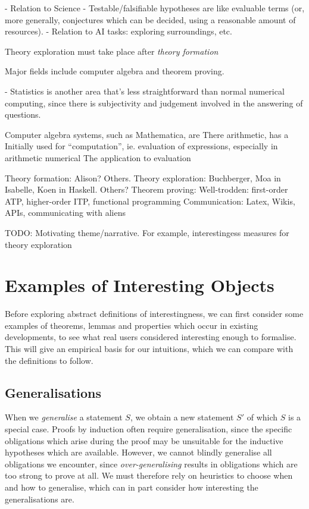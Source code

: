 \documentclass[]{article}
\begin{document}
 - Relation to Science
  - Testable/falsifiable hypotheses are like evaluable terms (or, more generally, conjectures which can be decided, using a reasonable amount of resources).
 - Relation to AI tasks: exploring surroundings, etc.

Theory exploration must take place after \emph{theory formation}

Major fields include computer algebra and theorem proving.

- Statistics is another area that's less straightforward than normal numerical computing, since there is subjectivity and judgement involved in the answering of questions.

Computer algebra systems, such as Mathematica, are
There arithmetic, has a Initially used for ``computation'', ie. evaluation of expressions,
especially in arithmetic numerical The application to evaluation

Theory formation: Alison? Others.
Theory exploration: Buchberger, Moa in Isabelle, Koen in Haskell. Others?
Theorem proving: Well-trodden: first-order ATP, higher-order ITP, functional programming
Communication: Latex, Wikis, APIs, communicating with aliens

TODO: Motivating theme/narrative. For example, interestingess measures for theory exploration

\section{Examples of Interesting Objects}
\label{examples}

Before exploring abstract definitions of interestingness, we can first consider some examples of theorems, lemmas and properties which occur in existing developments, to see what real users considered interesting enough to formalise. This will give an empirical basis for our intuitions, which we can compare with the definitions to follow.

\subsection{Generalisations}

When we \emph{generalise} a statement $S$, we obtain a new statement $S'$ of which $S$ is a special case. Proofs by induction often require generalisation, since the specific obligations which arise during the proof may be unsuitable for the inductive hypotheses which are available. However, we cannot blindly generalise all obligations we encounter, since \emph{over-generalising} results in obligations which are too strong to prove at all. We must therefore rely on heuristics to choose when and how to generalise, which can in part consider how interesting the generalisations are.
\end{document}
